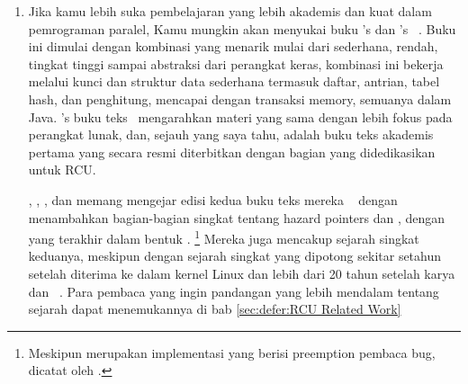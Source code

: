 \begin{enumerate}
\item 	Jika kamu lebih suka pembelajaran yang lebih akademis dan kuat
	dalam pemrograman paralel, Kamu mungkin akan menyukai buku 's
	dan 's ~\cite{HerlihyShavit2008Textbook,HerlihyShavit2020Textbook}.
	Buku ini dimulai dengan kombinasi yang menarik
	mulai dari sederhana, rendah, tingkat tinggi sampai abstraksi
	dari perangkat keras, kombinasi ini  bekerja melalui kunci
	dan struktur data sederhana termasuk daftar, antrian,
	tabel hash, dan penghitung, mencapai dengan transaksi
	memory, semuanya dalam Java.
	's buku teks~\cite{MichaelScott2013Textbook}
	mengarahkan materi yang sama dengan lebih fokus pada
	perangkat lunak, dan, sejauh yang saya tahu, adalah
	buku teks akademis pertama yang secara resmi diterbitkan dengan
	bagian yang didedikasikan untuk RCU\@.

	, ,
	, dan  memang
	mengejar edisi kedua buku teks mereka ~\cite{HerlihyShavit2020Textbook}
	dengan menambahkan bagian-bagian singkat tentang hazard pointers
	dan , dengan yang terakhir dalam bentuk  \@.
	\footnote{
		Meskipun merupakan implementasi yang berisi preemption pembaca
			bug, dicatat oleh .}
	Mereka juga mencakup sejarah singkat keduanya, meskipun dengan
	sejarah singkat  yang dipotong sekitar setahun setelah
	 diterima ke dalam kernel Linux dan lebih dari 20 tahun
	setelah karya  dan 
	~\cite{Kung80}.
	Para pembaca yang ingin pandangan yang lebih mendalam tentang
	sejarah dapat menemukannya di bab \cref{sec:defer:RCU Related Work}


\end{enumerate}
